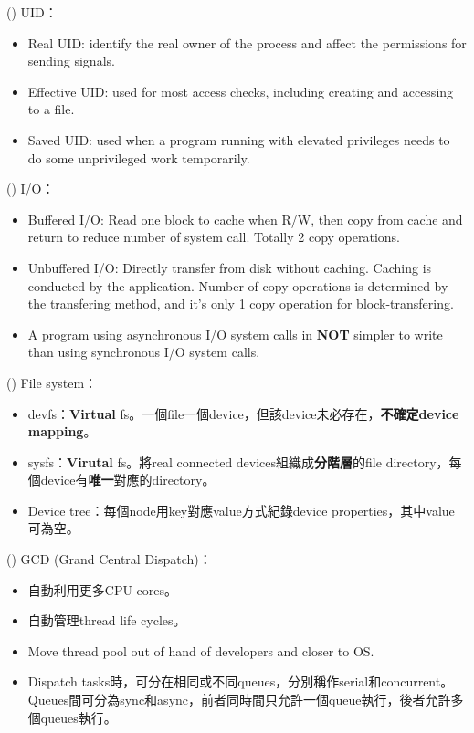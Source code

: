 \begin{theorem}{()} UID：\begin{itemize}
        \item Real UID: identify the real owner of the process and affect the permissions for sending signals.
        \item Effective UID: used for most access checks, including creating and accessing to a file.
        \item Saved UID: used when a program running with elevated privileges needs to do some unprivileged work temporarily.
    \end{itemize}
\end{theorem}

\begin{theorem}{()} I/O：\begin{itemize}
        \item Buffered I/O: Read one block to cache when R/W, then copy from cache and return to reduce number of system call. Totally 2 copy operations.
        \item Unbuffered I/O: Directly transfer from disk without caching. Caching is conducted by the application. Number of copy operations is determined by the transfering method, and it's only 1 copy operation for block-transfering. 
        \item A program using asynchronous I/O system calls in \textbf{NOT} simpler to write than using synchronous I/O system calls.
    \end{itemize}
\end{theorem}

\begin{theorem}{()} File system： \begin{itemize}
        \item devfs：\textbf{Virtual} fs。一個file一個device，但該device未必存在，\textbf{不確定device mapping}。
        \item sysfs：\textbf{Virutal} fs。將real connected devices組織成\textbf{分階層}的file directory，每個device有\textbf{唯一}對應的directory。
        \item Device tree：每個node用key對應value方式紀錄device properties，其中value可為空。
    \end{itemize}
\end{theorem}

\begin{theorem}{()} GCD (Grand Central Dispatch)： \begin{itemize}
        \item 自動利用更多CPU cores。
        \item 自動管理thread life cycles。
        \item Move thread pool out of hand of developers and closer to OS.
        \item Dispatch tasks時，可分在相同或不同queues，分別稱作serial和concurrent。Queues間可分為sync和async，前者同時間只允許一個queue執行，後者允許多個queues執行。
    \end{itemize}
\end{theorem}

